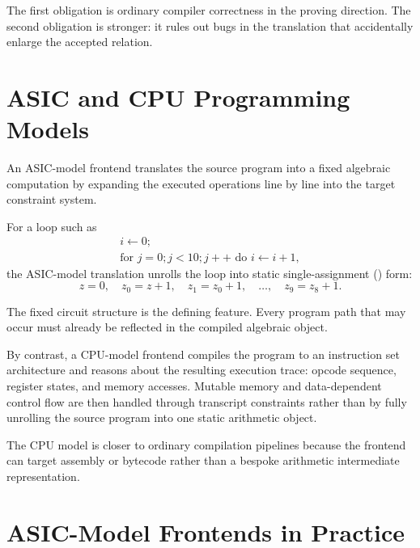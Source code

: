 \documentclass[11pt]{article}
\begin{document}
The first obligation is ordinary compiler correctness in the proving
direction.  The second obligation is stronger: it rules out bugs in the
translation that accidentally enlarge the accepted relation.

\section{ASIC and CPU Programming Models}

\begin{definition}
An ASIC-model frontend translates the source program into a fixed algebraic
computation by expanding the executed operations line by line into the target
constraint system.
\end{definition}

For a loop such as
\[
\begin{array}{l}
i \leftarrow 0; \\
\text{for } j = 0; j < 10; j++ \text{ do } i \leftarrow i+1,
\end{array}
\]
the ASIC-model translation unrolls the loop into static single-assignment
() form:
\[
  z = 0,\quad
  z_0 = z + 1,\quad
  z_1 = z_0 + 1,\quad
  \ldots,\quad
  z_9 = z_8 + 1.
\]

The fixed circuit structure is the defining feature.  Every program path that
may occur must already be reflected in the compiled algebraic object.

By contrast, a CPU-model frontend compiles the program to an instruction set
architecture and reasons about the resulting execution trace: opcode sequence,
register states, and memory accesses.  Mutable memory and data-dependent
control flow are then handled through transcript constraints rather than by
fully unrolling the source program into one static arithmetic object.

\begin{remark}
The CPU model is closer to ordinary compilation pipelines because the frontend
can target assembly or bytecode rather than a bespoke arithmetic intermediate
representation.
\end{remark}

\section{ASIC-Model Frontends in Practice}
\end{document}
